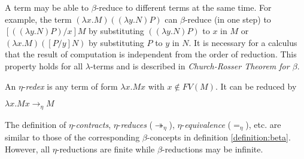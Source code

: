A term may be able to $ \beta $-reduce to different terms at the same time. For example, the term $ (\lambda x.M)((\lambda y.N)P) $ can $ \beta $-reduce (in one step) to $ [((\lambda y.N)P)/x]M $ by substituting $ ((\lambda y.N)P) $ to $ x $ in $ M $ or $ (\lambda x.M)([P/y]N) $ by substituting $ P $ to $ y $ in $ N $. It is necessary for a calculus that the result of computation is independent from the order of reduction. This property holds for all $ \lambda $-terms and is described in \emph{Church-Rosser Theorem for $ \beta $}.
\mbox\\
\begin{definition}
\label{definition:eta}
An $ \eta $-\emph{redex} is any term of form  $ \lambda x.Mx $ with $ x \not\in FV(M) $. It can be reduced by 
\begin{center}
$ \lambda x.Mx \to _\eta M $
\end{center}
The definition of $ \eta $-\emph{contracts}, $ \eta $-\emph{reduces} ($ \twoheadrightarrow _\eta $), $ \eta $-\emph{equivalence} ($ =_\eta $), etc. are similar to those of the corresponding $ \beta $-concepts in definition \ref{definition:beta}. However, all $ \eta $-reductions are finite while $ \beta $-reductions may be infinite.
\end{definition}

